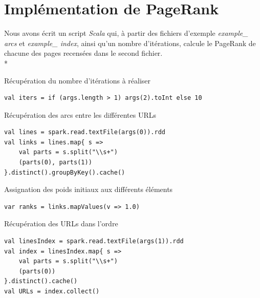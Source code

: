 \documentclass{article}
\begin{document}
\section{Impl\'{e}mentation de PageRank}

Nous avons \'{e}crit un script \textit{Scala} qui, \`{a} partir des fichiers d'exemple \textit{example\_ arcs} et \textit{example\_ index}, ainsi qu'un nombre d'it\'{e}rations, calcule le PageRank de chacune des pages recens\'{e}es dans le second fichier.\\*

\begin{enumerate}
\begin{item}
R\'{e}cup\'{e}ration du nombre d'it\'{e}rations \`{a} r\'{e}aliser
\begin{tcolorbox}
\begin{lstlisting}[style=Scala]
val iters = if (args.length > 1) args(2).toInt else 10
\end{lstlisting}
\end{tcolorbox}
\end{item}
\begin{item}
R\'{e}cup\'{e}ration des arcs entre les diff\'{e}rentes URLs
\begin{tcolorbox}
\begin{lstlisting}[style=Scala]
val lines = spark.read.textFile(args(0)).rdd
val links = lines.map{ s =>
	val parts = s.split("\\s+")
	(parts(0), parts(1))
}.distinct().groupByKey().cache()
\end{lstlisting}
\end{tcolorbox}
\end{item}
\begin{item}
Assignation des poids initiaux aux diff\'{e}rents \'{e}l\'{e}ments
\begin{tcolorbox}
\begin{lstlisting}[style=Scala]
var ranks = links.mapValues(v => 1.0)
\end{lstlisting}
\end{tcolorbox}
\end{item}
\begin{item}
R\'{e}cup\'{e}ration des URLs dans l'ordre
\begin{tcolorbox}
\begin{lstlisting}[style=Scala]
val linesIndex = spark.read.textFile(args(1)).rdd
val index = linesIndex.map{ s =>
	val parts = s.split("\\s+")
	(parts(0))
}.distinct().cache()
val URLs = index.collect()

\end{lstlisting}
\end{tcolorbox}
\end{item}
\end{enumerate}
\end{document}
